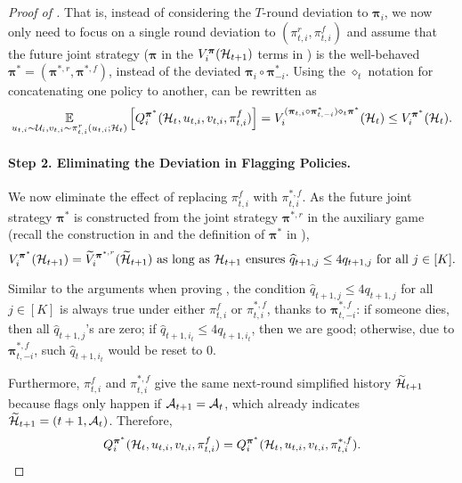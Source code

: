 \begin{proof}[Proof of ]
That is, instead of considering the $T$-round deviation to $\bm \pi_i$, we now only need to focus on a single round deviation to $(\pi_{t,i}^r,\pi_{t,i}^f)$ and assume that the future joint strategy ($\bm \pi$ in the $V_i^{\bm \pi}(\mathcal{H}_{t+1})$ terms in ) is the well-behaved $\bm \pi^\ast=({\bm \pi}^{\ast,r},{\bm \pi}^{\ast,f})$, instead of the deviated $\bm \pi_i\circ \bm \pi_{-i}^\ast$.
Using the $\diamond_t$ notation for concatenating one policy to another,  can be rewritten as
\begin{equation*}
\E_{u_{t,i}\sim \mV_i,v_{t,i}\sim \pi_{t,i}^r(u_{t,i};\mH_t)}\left [Q_i^{\bm \pi^\ast}(\mH_t,u_{t,i},v_{t,i},\pi_{t,i}^f)\right ]=V_i^{(\bm \pi_{t,i}\circ \bm \pi_{t,-i}^\ast)\diamond_t \bm \pi^\ast}(\mH_t)\le V_i^{\bm \pi^\ast}(\mH_t).
\end{equation*}

\paragraph{Step 2. Eliminating the Deviation in Flagging Policies.}
We now eliminate the effect of replacing ${\pi}_{t,i}^f$ with $\pi_{t,i}^{\ast,f}$.
As the future joint strategy $\bm \pi^\ast$ is constructed from the joint strategy ${\bm \pi}^{\ast,r}$ in the auxiliary game (recall the construction in  and the definition of $\bm \pi^\ast$ in ),
\begin{equation*}
V_i^{\bm \pi^\ast}(\mathcal{H}_{t+1})=\widetilde V_i^{{\bm \pi}^{\ast,r}}(\widetilde{\mathcal{H}}_{t+1})\text{ as long as }\mathcal{H}_{t+1}\text{ ensures }\widehat q_{t+1,j}\le 4q_{t+1,j}\text{ for all } j\in [K].
\end{equation*}

Similar to the arguments when proving , the condition $\hat q_{t+1,j}\le 4q_{t+1,j}$ for all $j\in [K]$ is always true under either $\pi_{t,i}^f$ or ${\pi}_{t,i}^{\ast,f}$, thanks to ${\bm \pi}_{t,-i}^{\ast,f}$: if someone dies, then all $\hat q_{t+1,j}$'s are zero; if $\hat q_{t+1,i_t}\le 4q_{t+1,i_t}$, then we are good; otherwise, due to ${\bm \pi}_{t,-i}^{\ast,f}$, such $\hat q_{t+1,i_t}$ would be reset to $0$.

Furthermore, ${\pi}_{t,i}^f$ and $\pi_{t,i}^{\ast,f}$ give the same next-round simplified history $\widetilde {\mathcal{H}}_{t+1}$ because flags only happen if $\mathcal{A}_{t+1}=\mathcal{A}_t$, which already indicates $\widetilde {\mathcal{H}}_{t+1}=(t+1,\mathcal{A}_t)$. Therefore,
\begin{equation}\label{eq:eliminate_flag}
Q_i^{\bm \pi^\ast}(\mathcal{H}_t,u_{t,i},v_{t,i},\pi_{t,i}^f) = Q_i^{\bm \pi^\ast}(\mathcal{H}_t,u_{t,i},v_{t,i},\pi_{t,i}^{\ast,f}).
\end{equation}


\end{proof}
